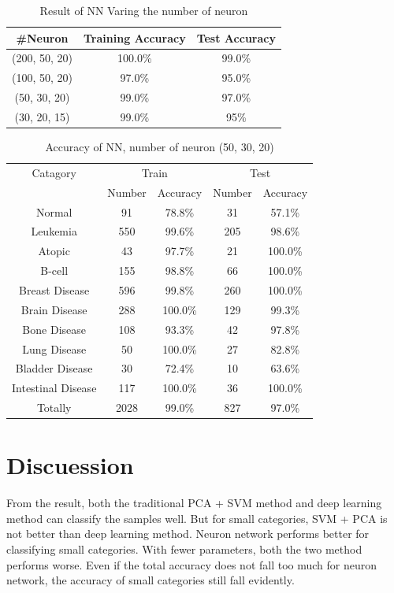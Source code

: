 \documentclass[sigchi]{acmart}
\begin{document}
\begin{table}
  \caption{Result of NN Varing the number of neuron}
  \label{tab:varingneuron}
  \begin{tabular}{ccc}
    \toprule
    \#Neuron & Training Accuracy & Test Accuracy \\
    \midrule
    (200, 50, 20) & 100.0\% & 99.0\% \\
    (100, 50, 20) & 97.0\% & 95.0\% \\
    (50, 30, 20) & 99.0\% & 97.0\% \\
    (30, 20, 15) & 99.0\% & 95\%\\
    \bottomrule
  \end{tabular}
\end{table}

\begin{table}
  \caption{Accuracy of NN, number of neuron (50, 30, 20)}
  \label{tab:AccuracyNN_small}
  \begin{tabular}{ccccc}
    \toprule
    Catagory & \multicolumn{2}{c}{Train} & \multicolumn{2}{c}{Test}\\
    & Number & Accuracy & Number & Accuracy\\
    \midrule
    Normal & 91 & 78.8\% & 31 & 57.1\% \\
    Leukemia & 550 & 99.6\% & 205 & 98.6\% \\
    Atopic & 43 & 97.7\% & 21 & 100.0\% \\
    B-cell & 155 & 98.8\% & 66 & 100.0\% \\
    Breast Disease &  596 & 99.8\% & 260 & 100.0\% \\
    Brain Disease & 288 & 100.0\% & 129 & 99.3\% \\
    Bone Disease & 108 & 93.3\% & 42 & 97.8\% \\
    Lung Disease & 50 & 100.0\% & 27 & 82.8\% \\
    Bladder Disease & 30 & 72.4\% & 10 & 63.6\% \\
    Intestinal Disease & 117 & 100.0\% & 36 & 100.0\% \\
    \midrule
    Totally & 2028 & 99.0\% & 827 & 97.0\% \\
    \bottomrule
  \end{tabular}
\end{table}

\section{Discuession}

From the result, both the traditional PCA + SVM method and deep learning method can classify the samples well. But for small categories, SVM + PCA is not better than deep learning method. Neuron network performs better for classifying small categories. With fewer parameters, both the two method performs worse. Even if the total accuracy does not fall too much for neuron network, the accuracy of small categories still fall evidently.
\end{document}

